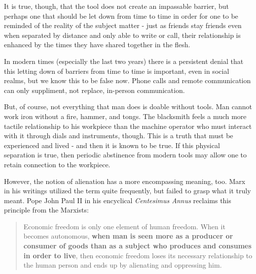\documentclass[letterpaper]{article}
\begin{document}
It is true, though, that the tool does not create an impassable barrier, but perhaps one that should be let down from time to time in order for one to be reminded of the reality of the subject matter - just as friends stay friends even when separated by distance and only able to write or call, their relationship is enhanced by the times they have shared together in the flesh.

In modern times (especially the last two years) there is a persistent denial that this letting down of barriers from time to time is important, even in social realms, but we know this to be false now. Phone calls and remote communication can only suppliment, not replace, in-person communication.

But, of course, not everything that man does is doable without tools. Man cannot work iron without a fire, hammer, and tongs. The blacksmith feels a much more tactile relationship to his workpiece than the machine operator who must interact with it through dials and instruments, though. This is a truth that must be experienced and lived - and then it is known to be true. If this physical separation is true, then periodic abstinence from modern tools may allow one to retain connection to the workpiece.

However, the notion of alienation has a more encompassing meaning, too. Marx in his writings utilized the term quite frequently, but failed to grasp what it truly meant. Pope John Paul II in his encyclical \textit{Centesimus Annus} reclaims this principle from the Marxists:

\begin{quote}
  Economic freedom is only one element of human freedom. When it becomes autonomous, \textbf{when man is seen more as a producer or consumer of goods than as a subject who produces and consumes in order to live}, then economic freedom loses its necessary relationship to the human person and ends up by alienating and oppressing him.
\end{quote}
\end{document}
